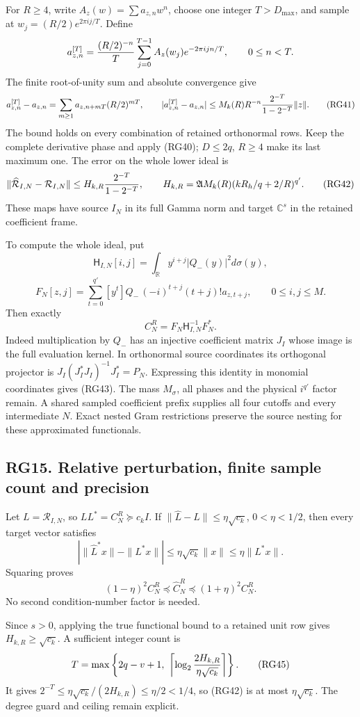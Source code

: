 \documentclass[11pt]{article}
\begin{document}
For \(R\ge4\), write \(A_z(w)=\sum a_{z,n}w^n\), choose one integer \(T>D_{\max}\), and sample at \(w_j=(R/2)e^{2\pi ij/T}\). Define \[
a_{z,n}^{[T]}={(R/2)^{-n}\over T}
\sum_{j=0}^{T-1}A_z(w_j)e^{-2\pi ijn/T},\qquad0\le n<T.
\] The finite root-of-unity sum and absolute convergence give \[
a_{z,n}^{[T]}-a_{z,n}
=\sum_{m\ge1}a_{z,n+mT}(R/2)^{mT},\qquad
|a_{z,n}^{[T]}-a_{z,n}|
\le M_k(R)R^{-n}{2^{-T}\over1-2^{-T}}\|z\|.
\tag{RG41}
\] The bound holds on every combination of retained orthonormal rows. Keep the complete derivative phase and apply (RG40); \(D\le2q\), \(R\ge4\) make its last maximum one. The error on the whole lower ideal is \[
\|\widehat{\mathcal R}_{I,N}-\mathcal R_{I,N}\|
\le H_{k,R}{2^{-T}\over1-2^{-T}},\qquad
H_{k,R}=\mathfrak A M_k(R)(kR_h/q+2/R)^{q'}.
\tag{RG42}
\] These maps have source \(I_N\) in its full Gamma norm and target \(\mathbb C^s\) in the retained coefficient frame.

To compute the whole ideal, put \[
\mathsf H_{I,N}[i,j]=\int_{\mathbb R}y^{i+j}|Q_-(y)|^2d\sigma(y),
\] \[
F_N[z,j]=\sum_{t=0}^{q'}[y^t]Q_-\,(-i)^{t+j}(t+j)!a_{z,t+j},
\qquad 0\le i,j\le M.
\] Then exactly \[
C_N^R=F_N\mathsf H_{I,N}^{-1}F_N^*.
\tag{RG43}
\] Indeed multiplication by \(Q_-\) has an injective coefficient matrix \(J_I\) whose image is the full evaluation kernel. In orthonormal source coordinates its orthogonal projector is \(J_I(J_I^*J_I)^{-1}J_I^*=P_N\). Expressing this identity in monomial coordinates gives (RG43). The mass \(M_\sigma\), all phases and the physical \(i^{q'}\) factor remain. A shared sampled coefficient prefix supplies all four cutoffs and every intermediate \(N\). Exact nested Gram restrictions preserve the source nesting for these approximated functionals.

\subsection{RG15. Relative perturbation, finite sample count and precision}\label{rg15.-relative-perturbation-finite-sample-count-and-precision}

Let \(L=\mathcal R_{I,N}\), so \(LL^*=C_N^R\succeq c_kI\). If \(\|\widehat L-L\|\le\eta\sqrt{c_k}\), \(0<\eta<1/2\), then every target vector satisfies \[
|\|\widehat L^*x\|-\|L^*x\||\le\eta\sqrt{c_k}\|x\|
\le\eta\|L^*x\|.
\] Squaring proves \[
(1-\eta)^2C_N^R\preceq\widehat C_N^R\preceq(1+\eta)^2C_N^R.
\tag{RG44}
\] No second condition-number factor is needed.

Since \(s>0\), applying the true functional bound to a retained unit row gives \(H_{k,R}\ge\sqrt{c_k}\). A sufficient integer count is \[
T=\max\left\{2q-v+1,\
\left\lceil\log_2{2H_{k,R}\over\eta\sqrt{c_k}}\right\rceil\right\}.
\tag{RG45}
\] It gives \(2^{-T}\le\eta\sqrt{c_k}/(2H_{k,R})\le\eta/2<1/4\), so (RG42) is at most \(\eta\sqrt{c_k}\). The degree guard and ceiling remain explicit.
\end{document}

